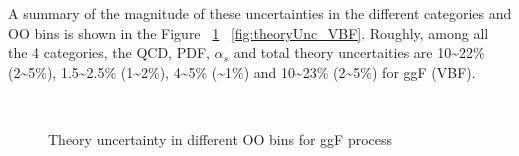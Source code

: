 A summary of the magnitude of these uncertainties in the different categories and OO bins is shown in the Figure ~\ref{fig:theoryUnc_ggF} ~\ref{fig:theoryUnc_VBF}. Roughly, among all the 4 categories, the QCD, PDF, $\alpha_{s}$ and total theory uncertaities are 10\textasciitilde22\% (2\textasciitilde5\%), 1.5\textasciitilde2.5\% (1\textasciitilde2\%), 4\textasciitilde5\% (\textasciitilde1\%) and 10\textasciitilde23\% (2\textasciitilde5\%) for ggF (VBF).
\begin{figure}[htbp]
\centering
  \\
  \caption{Theory uncertainty in different OO bins for ggF process}
  \label{fig:theoryUnc_ggF}
\end{figure}

